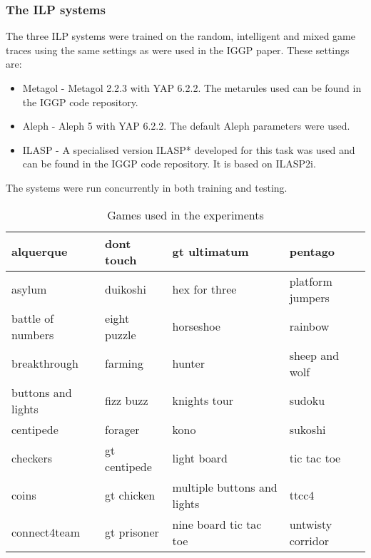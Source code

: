 \subsubsection{The ILP systems}

The three ILP systems were trained on the random, intelligent and mixed game traces using the same settings as were used in the IGGP paper\cite{Cropper/IGGP}. These settings are:
\begin{itemize}
	\item Metagol - Metagol 2.2.3 with YAP 6.2.2. The metarules used can be found in the IGGP code repository.
	\item Aleph - Aleph 5 with YAP 6.2.2. The default Aleph parameters were used.
	\item ILASP - A specialised version ILASP* developed for this task was used and can be found in the IGGP code repository. It is based on ILASP2i.
\end{itemize}
The systems were run concurrently in both training and testing.


\begin{table}[]
\begin{tabular}{|l|l|l|l|}
	\hline
	alquerque           & dont touch    & gt ultimatum              & pentago\\ \hline
	asylum              & duikoshi      & hex for   three               & platform jumpers\\ \hline
	battle of numbers   & eight puzzle  & horseshoe                 & rainbow\\ \hline
	breakthrough        & farming       & hunter                    & sheep and wolf\\ \hline
	buttons and lights  & fizz buzz      & knights tour              & sudoku\\ \hline
	centipede           & forager       & kono                      & sukoshi\\ \hline
	checkers            & gt centipede  & light board                & tic tac toe \\ \hline
	coins               & gt chicken    & multiple buttons and lights  & ttcc4 \\ \hline
	connect4team        & gt prisoner   & nine board tic tac toe        & untwisty corridor \\ \hline
\end{tabular}
\caption{Games used in the experiments}
\label{tab:Games}
\end{table}


